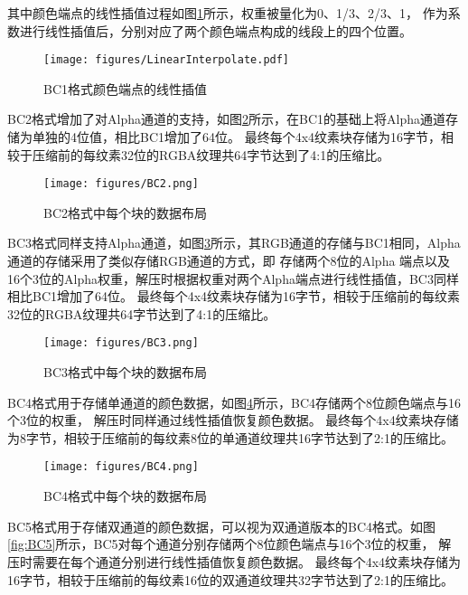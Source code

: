 其中颜色端点的线性插值过程如图\ref{fig:LinearInterpolate}所示，权重被量化为0、1/3、2/3、1，
作为系数进行线性插值后，分别对应了两个颜色端点构成的线段上的四个位置。

\begin{figure}[htbp]
    \centering
    \texttt{[image: figures/LinearInterpolate.pdf]}
    \caption{BC1格式颜色端点的线性插值}
    \label{fig:LinearInterpolate}
\end{figure}

BC2格式增加了对Alpha通道的支持，如图\ref{fig:BC2}所示，在BC1的基础上将Alpha通道存储为单独的4位值，相比BC1增加了64位。
最终每个4x4纹素块存储为16字节，相较于压缩前的每纹素32位的RGBA纹理共64字节达到了4:1的压缩比。

\begin{figure}[htbp]
    \centering
    \texttt{[image: figures/BC2.png]}
    \caption{BC2格式中每个块的数据布局}
    \label{fig:BC2}
\end{figure}    

BC3格式同样支持Alpha通道，如图\ref{fig:BC3}所示，其RGB通道的存储与BC1相同，Alpha通道的存储采用了类似存储RGB通道的方式，即
存储两个8位的Alpha 端点以及16个3位的Alpha权重，解压时根据权重对两个Alpha端点进行线性插值，BC3同样相比BC1增加了64位。
最终每个4x4纹素块存储为16字节，相较于压缩前的每纹素32位的RGBA纹理共64字节达到了4:1的压缩比。

\begin{figure}[htbp]
    \centering
    \texttt{[image: figures/BC3.png]}
    \caption{BC3格式中每个块的数据布局}
    \label{fig:BC3}
\end{figure}

BC4格式用于存储单通道的颜色数据，如图\ref{fig:BC4}所示，BC4存储两个8位颜色端点与16个3位的权重，
解压时同样通过线性插值恢复颜色数据。
最终每个4x4纹素块存储为8字节，相较于压缩前的每纹素8位的单通道纹理共16字节达到了2:1的压缩比。

\begin{figure}[htbp]
    \centering
    \texttt{[image: figures/BC4.png]}
    \caption{BC4格式中每个块的数据布局}
    \label{fig:BC4}
\end{figure}

BC5格式用于存储双通道的颜色数据，可以视为双通道版本的BC4格式。如图\ref{fig:BC5}所示，BC5对每个通道分别存储两个8位颜色端点与16个3位的权重，
解压时需要在每个通道分别进行线性插值恢复颜色数据。
最终每个4x4纹素块存储为16字节，相较于压缩前的每纹素16位的双通道纹理共32字节达到了2:1的压缩比。

